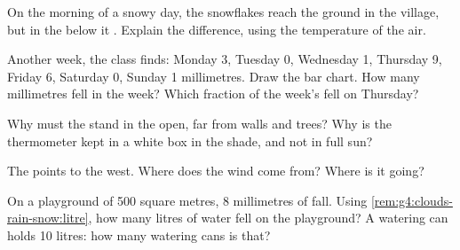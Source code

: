 \begin{exercise}[$\star\star$]\label{exo:g4:clouds-rain-snow:7}
On the morning of a snowy day, the snowflakes reach the ground in the
 village, but in the  below it . Explain the difference,
using the temperature of the air.
\end{exercise}

\begin{exercise}[$\star\star$]\label{exo:g4:clouds-rain-snow:8}
Another week, the class finds: Monday 3, Tuesday 0, Wednesday 1, Thursday
9, Friday 6, Saturday 0, Sunday 1 millimetres. Draw the bar chart. How many
millimetres fell in the week? Which fraction of the week's  fell on
Thursday?
\end{exercise}

\begin{exercise}[$\star\star$]\label{exo:g4:clouds-rain-snow:9}
Why must the  stand in the open, far from walls and trees? Why
is the thermometer kept in a white box in the shade, and not in full sun?
\end{exercise}

\begin{exercise}[$\star\star$]\label{exo:g4:clouds-rain-snow:10}
The  points to the west. Where does the wind come from? Where is
it going?
\end{exercise}

\begin{exercise}[$\star\star\star$]\label{exo:g4:clouds-rain-snow:11}
On a playground of 500 square metres, 8 millimetres of  fall. Using
\cref{rem:g4:clouds-rain-snow:litre}, how many litres of water fell on the
playground? A watering can holds 10 litres: how many watering cans is that?
\end{exercise}
